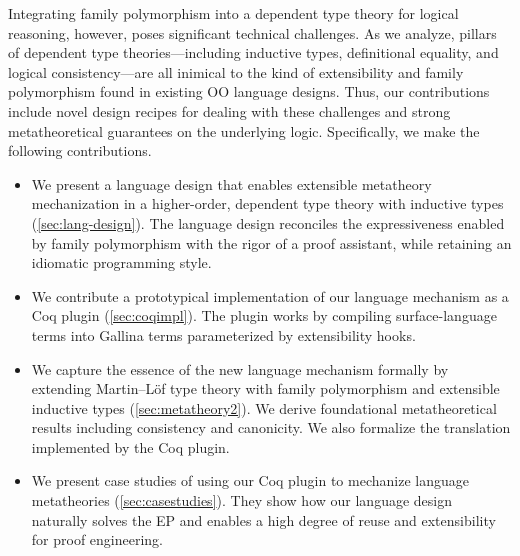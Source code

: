 Integrating family polymorphism into a dependent type theory for
logical reasoning, however, poses significant technical challenges.
As we analyze, pillars of dependent type theories—including
inductive types, definitional equality, and logical consistency—are
all inimical to the kind of extensibility and family polymorphism
found in existing OO language designs.
Thus, our contributions include novel design recipes for dealing with
these challenges and strong meta\-theoretical guarantees on the
underlying logic.
%
Specifically, we make the following contributions.

\endgroup

\begin{itemize}[leftmargin=3.5ex]

\item We present a
language design that enables extensible
metatheory mechanization in a higher-order, dependent type theory with
inductive types (\cref{sec:lang-design}).
The language design reconciles the expressiveness enabled by
family polymorphism with the rigor of a proof assistant,
while retaining an idiomatic programming style.

\item We contribute a prototypical implementation of our language
mechanism as a Coq plugin (\cref{sec:coqimpl}). The plugin works by
compiling surface-language terms into Gallina terms parameterized by
extensibility hooks.

\item We capture the essence of the new language mechanism formally by extending
Martin–Löf type theory with family polymorphism and extensible inductive
types (\cref{sec:metatheory2}).
We derive foundational meta\-theoretical results including consistency
and canonicity.
We also formalize the translation implemented by the Coq plugin.

\item We present case studies of using our Coq plugin to mechanize
language metatheories (\cref{sec:casestudies}).
They show how our language design naturally solves the EP and
enables a high degree of reuse and extensibility
for proof engineering.

\end{itemize}

